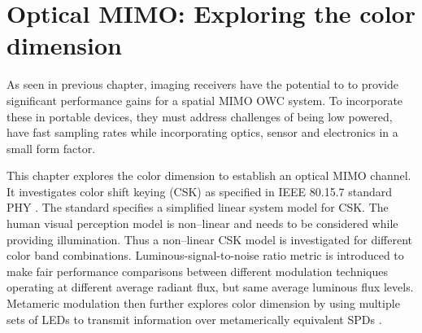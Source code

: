 \chapter{Optical MIMO: Exploring the color dimension}
\label{chapter:mimoColor}
\thispagestyle{myheadings}
As seen in previous chapter, imaging receivers have the potential to to provide significant performance gains for a spatial MIMO OWC system. To incorporate these in portable devices, they must address challenges of being low powered, have fast sampling rates while incorporating optics, sensor and electronics in a small form factor.

This chapter explores the color dimension to establish an optical MIMO channel. It investigates color shift keying (CSK) as specified in IEEE 80.15.7 standard PHY  . The standard specifies a simplified linear system model for CSK. The human visual perception model is non--linear and needs to be considered while providing illumination. Thus a non--linear CSK model is investigated for different color band combinations. Luminous-signal-to-noise ratio metric is introduced to make fair performance comparisons between different modulation techniques operating at different average radiant flux, but same average luminous flux levels. Metameric modulation then further explores color dimension by using multiple sets of LEDs to transmit information over metamerically equivalent SPDs \cite{but12a}.






